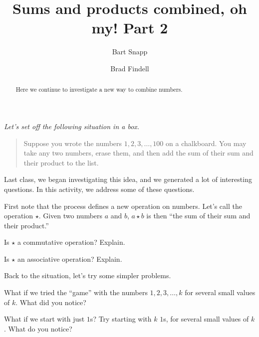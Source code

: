 \documentclass{ximera}
\title{Sums and products combined, oh my!  Part 2}
\author{Bart Snapp \and Brad Findell}
\begin{document}
\begin{abstract}
Here we continue to investigate a new way to combine numbers.
\end{abstract}
\maketitle

\emph{Let's set off the following situation in a box.} 
\begin{quote}
Suppose you wrote the numbers $1,2,3,\dots,100$ on a chalkboard. You
may take any two numbers, erase them, and then add the sum of their
sum and their product to the list.
\end{quote}
Last class, we began investigating this idea, and we generated a lot
of interesting questions.  In this activity, we address some of these
questions.

First note that the process defines a new operation on numbers.  Let's
call the operation $\star$.  Given two numbers $a$ and $b$, $a\star b$
is then ``the sum of their sum and their product.''

\begin{problem}
Is $\star$ a commutative operation?  Explain.  
\begin{freeResponse}
\end{freeResponse}
\end{problem}

\begin{problem}
Is $\star$ an associative operation?  Explain.  
\begin{freeResponse}
\end{freeResponse}
\end{problem}

Back to the situation, let's try some simpler problems.  

\begin{problem}
What if we tried the ``game'' with the numbers $1,2,3,\dots, k$ for
several small values of $k$.  What did you notice?
\begin{freeResponse}
\end{freeResponse}
\end{problem}

\begin{problem}
What if we start with just $1$s?  Try starting with $k$ $1$s, for
several small values of $k$.  What do you notice?
\begin{freeResponse}
\end{freeResponse}
\end{problem}
\end{document}
